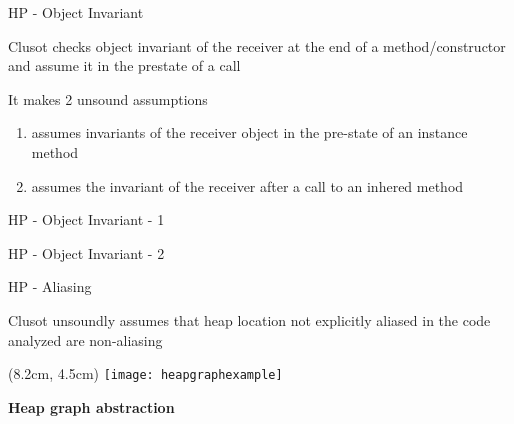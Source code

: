 
\begin{frame}{HP - Object Invariant}

\vspace*{-0.4cm}

Clusot checks object invariant of the receiver at the end of a
method/constructor and assume it in the prestate of a call

\vfill

It makes 2 unsound assumptions
\begin{enumerate}
\item assumes invariants of the receiver object in the pre-state of an
instance method
\item assumes the invariant of the receiver after a call to an
inhered method
\end{enumerate}

\end{frame}


\begin{frame}[fragile]{HP - Object Invariant - 1}
\vspace*{-0.4cm}
\only<1>{}
\end{frame}


\begin{frame}[fragile]{HP - Object Invariant - 2}
\vspace*{-0.4cm}
\only<1>{}
\end{frame}


\begin{frame}{HP - Aliasing}

\vspace*{-0.4cm}

Clusot unsoundly assumes that heap location not explicitly aliased in the code
analyzed are non-aliasing

\vfill

\begin{textblock*}{1cm}(8.2cm, 4.5cm)
    \texttt{[image: heapgraphexample]}
\end{textblock*}

\textbf{Heap graph abstraction}


\end{frame}


